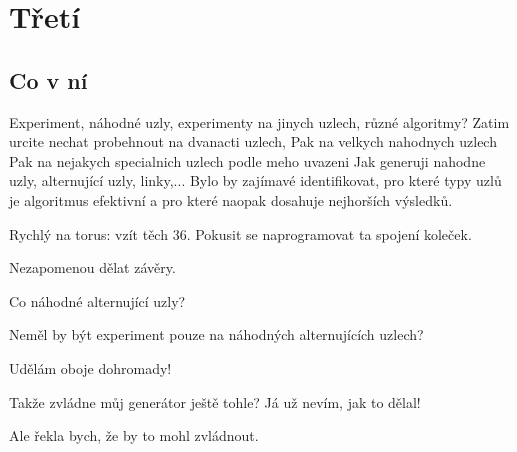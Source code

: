 
\chapter{Třetí}

\section{Co v ní}
Experiment, náhodné uzly, experimenty na jinych uzlech, různé algoritmy?
Zatim urcite nechat probehnout na dvanacti uzlech,
Pak na velkych nahodnych uzlech
Pak na nejakych specialnich uzlech podle meho uvazeni
Jak generuji nahodne uzly, alternující uzly, linky,...
Bylo by zajímavé identifikovat, pro které typy uzlů je algoritmus efektivní a pro které naopak dosahuje nejhorších výsledků.

Rychlý na torus: vzít těch 36.
Pokusit se naprogramovat ta spojení koleček.

Nezapomenou dělat závěry.

Co náhodné alternující uzly?

Neměl by být experiment pouze na náhodných alternujících uzlech?

Udělám oboje dohromady!

Takže zvládne můj generátor ještě tohle? Já už nevím, jak to dělal!

Ale řekla bych, že by to mohl zvládnout.
